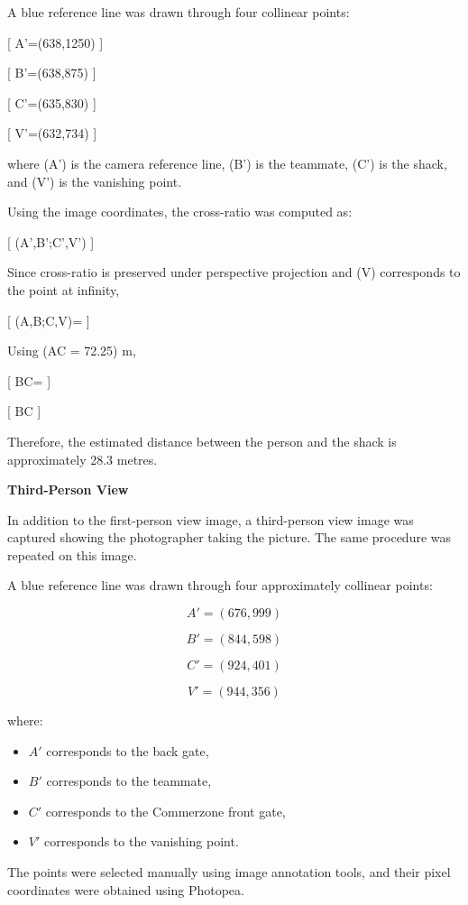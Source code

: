 \begin{enumerate}
\begin{studentSpace}
A blue reference line was drawn through four collinear points:

[
A'=(638,1250)
]

[
B'=(638,875)
]

[
C'=(635,830)
]

[
V'=(632,734)
]

where (A') is the camera reference line, (B') is the teammate, (C') is the shack, and (V') is the vanishing point.

Using the image coordinates, the cross-ratio was computed as:

[
(A',B';C',V') 
]

Since cross-ratio is preserved under perspective projection and (V) corresponds to the point at infinity,

[
(A,B;C,V)=
]

Using (AC = 72.25) m,

[
BC=
]

[
BC 
]

Therefore, the estimated distance between the person and the shack is approximately 28.3 metres.


\textbf{Third-Person View}

In addition to the first-person view image, a third-person view image was captured showing the photographer taking the picture. The same procedure was repeated on this image.

A blue reference line was drawn through four approximately collinear points:

\[
A' = (676,999)
\]

\[
B' = (844,598)
\]

\[
C' = (924,401)
\]

\[
V' = (944,356)
\]

where:

\begin{itemize}
    \item \(A'\) corresponds to the back gate,
    \item \(B'\) corresponds to the teammate,
    \item \(C'\) corresponds to the Commerzone front gate,
    \item \(V'\) corresponds to the vanishing point.
\end{itemize}

The points were selected manually using image annotation tools, and their pixel coordinates were obtained using Photopea.


\end{studentSpace}
\end{enumerate}
